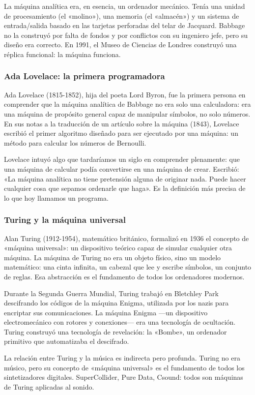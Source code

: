 \documentclass[14pt, a4paper]{article}
\begin{document}
La máquina analítica era, en esencia, un ordenador mecánico. Tenía una
unidad de procesamiento (el «molino»), una memoria (el «almacén») y un
sistema de entrada/salida basado en las tarjetas perforadas del telar
de Jacquard. Babbage no la construyó por falta de fondos y por
conflictos con su ingeniero jefe, pero su diseño era correcto. En
1991, el Museo de Ciencias de Londres construyó una réplica funcional:
la máquina funciona.
\subsubsection{Ada Lovelace: la primera programadora}
\label{ada-lovelace}
Ada Lovelace (1815-1852), hija del poeta Lord Byron, fue la primera
persona en comprender que la máquina analítica de Babbage no era solo
una calculadora: era una máquina de propósito general capaz de
manipular símbolos, no solo números. En sus notas a la traducción de
un artículo sobre la máquina (1843), Lovelace escribió el primer
algoritmo diseñado para ser ejecutado por una máquina: un método para
calcular los números de Bernoulli.

Lovelace intuyó algo que tardaríamos un siglo en comprender
plenamente: que una máquina de calcular podía convertirse en una
máquina de crear. Escribió: «La máquina analítica no tiene
pretensión alguna de originar nada. Puede hacer cualquier cosa que
sepamos ordenarle que haga». Es la definición más precisa de lo que
hoy llamamos un programa.
\subsubsection{Turing y la máquina universal}
\label{turing}
Alan Turing (1912-1954), matemático británico, formalizó en 1936 el
concepto de «máquina universal»: un dispositivo teórico capaz de
simular cualquier otra máquina. La máquina de Turing no era un objeto
físico, sino un modelo matemático: una cinta infinita, un cabezal que
lee y escribe símbolos, un conjunto de reglas. Esa abstracción es el
fundamento de todos los ordenadores modernos.

Durante la Segunda Guerra Mundial, Turing trabajó en Bletchley Park
descifrando los códigos de la máquina Enigma, utilizada por los nazis
para encriptar sus comunicaciones. La máquina Enigma —un dispositivo
electromecánico con rotores y conexiones— era una tecnología de
ocultación. Turing construyó una tecnología de revelación: la
«Bombe», un ordenador primitivo que automatizaba el descifrado.

La relación entre Turing y la música es indirecta pero profunda.
Turing no era músico, pero su concepto de «máquina universal» es el
fundamento de todos los sintetizadores digitales. SuperCollider, Pure
Data, Csound: todos son máquinas de Turing aplicadas al sonido.
\end{document}
